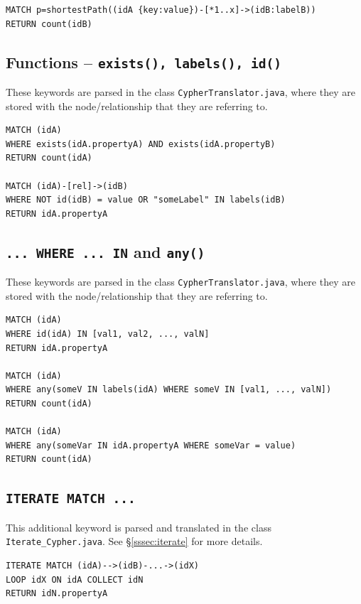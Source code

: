 \documentclass[letterpaper]{ltxdoc}
\begin{document}
\medskip

\begin{lstlisting}[language = Cypher]
MATCH p=shortestPath((idA {key:value})-[*1..x]->(idB:labelB))
RETURN count(idB)
\end{lstlisting}

\subsection*{Functions -- \texttt{exists(), labels(), id()}}
These keywords are parsed in the class \texttt{CypherTranslator.java}, where they are stored with the node/relationship that they are referring to.

\medskip

\begin{lstlisting}[language = Cypher]
MATCH (idA)
WHERE exists(idA.propertyA) AND exists(idA.propertyB)
RETURN count(idA)

MATCH (idA)-[rel]->(idB)
WHERE NOT id(idB) = value OR "someLabel" IN labels(idB)
RETURN idA.propertyA
\end{lstlisting}

\subsection*{\texttt{... WHERE ... IN} and \texttt{any()}}
These keywords are parsed in the class \texttt{CypherTranslator.java}, where they are stored with the node/relationship that they are referring to.

\medskip

\begin{lstlisting}[language = Cypher]
MATCH (idA)
WHERE id(idA) IN [val1, val2, ..., valN]
RETURN idA.propertyA

MATCH (idA)
WHERE any(someV IN labels(idA) WHERE someV IN [val1, ..., valN])
RETURN count(idA)

MATCH (idA)
WHERE any(someVar IN idA.propertyA WHERE someVar = value)
RETURN count(idA)
\end{lstlisting}

\subsection*{\texttt{ITERATE MATCH ...}}
This additional keyword is parsed and translated in the class \texttt{Iterate\_Cypher.java}. See \S \ref{sssec:iterate} for more details.

\medskip

\begin{lstlisting}[language = Cypher]
ITERATE MATCH (idA)-->(idB)-...->(idX)
LOOP idX ON idA COLLECT idN
RETURN idN.propertyA
\end{lstlisting}
\end{document}
